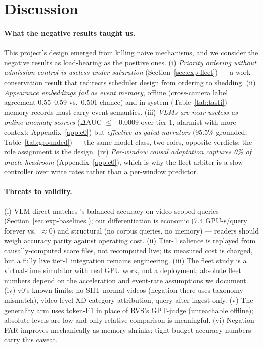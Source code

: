 \section{Discussion}
\label{sec:discussion}

\paragraph{What the negative results taught us.} This project's design emerged from killing naive mechanisms, and we consider the negative results as load-bearing as the positive ones. (i) \emph{Priority ordering without admission control is useless under saturation} (Section~\ref{sec:exp-fleet}) --- a work-conservation result that redirects scheduler design from ordering to shedding. (ii) \emph{Appearance embeddings fail as event memory}, offline (cross-camera label agreement 0.55--0.59 vs.\ 0.501 chance) and in-system (Table~\ref{tab:tasti}) --- memory records must carry event semantics. (iii) \emph{VLMs are near-useless as online anomaly scorers} ($\Delta$AUC $\le +0.0009$ over tier-1, alarmist with more context; Appendix~\ref{app:e0}) but \emph{effective as gated narrators} (95.5\% grounded; Table~\ref{tab:grounded}) --- the same model class, two roles, opposite verdicts; the role assignment is the design. (iv) \emph{Per-window causal adaptation captures 0\% of oracle headroom} (Appendix~\ref{app:e0}), which is why the fleet arbiter is a slow controller over write rates rather than a per-window predictor.

\paragraph{Threats to validity.} (i) VLM-direct matches \sys's balanced accuracy on video-scoped queries (Section~\ref{sec:exp-baselines}); our differentiation is economic (7.4 GPU-s/query forever vs.\ $\approx$0) and structural (no corpus queries, no memory) --- readers should weigh accuracy parity against operating cost. (ii) Tier-1 salience is replayed from causally-computed score files, not recomputed live; its measured cost is charged, but a fully live tier-1 integration remains engineering. (iii) The fleet study is a virtual-time simulator with real GPU work, not a deployment; absolute fleet numbers depend on the acceleration and event-rate assumptions we document. (iv) \smb v0's known limits: no SHT normal videos (negation there uses taxonomy mismatch), video-level XD category attribution, query-after-ingest only. (v) The generality arm uses token-F1 in place of RVS's GPT-judge (unreachable offline); absolute levels are low and only relative comparison is meaningful. (vi) Negation FAR improves mechanically as memory shrinks; tight-budget accuracy numbers carry this caveat.

